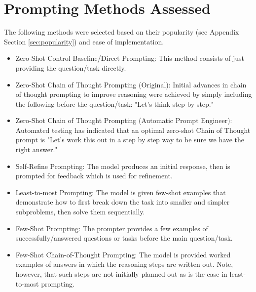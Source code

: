 \documentclass[11pt]{article}
\begin{document}
\section*{Prompting Methods Assessed}

The following methods were selected based on their popularity (see Appendix Section \ref{sec:popularity}) and ease of implementation.

\begin{itemize}
  \item Zero-Shot Control Baseline/Direct Prompting: This method consists of just providing the question/task directly.
  \item Zero-Shot Chain of Thought Prompting (Original): Initial advances in chain of thought prompting to improve reasoning were achieved by simply including the following before the question/task: "Let's think step by step." \cite{kojima_large_2023}
  \item Zero-Shot Chain of Thought Prompting (Automatic Prompt Engineer): Automated testing has indicated that an optimal zero-shot Chain of Thought prompt is "Let's work this out in a step by step way to be sure we have the right answer." \cite{zhou_large_2022}
  \item Self-Refine Prompting: The model produces an initial response, then is prompted for feedback which is used for refinement. \cite{madaan_self-refine_2023}
  \item Least-to-most Prompting: The model is given few-shot examples that demonstrate how to first break down the task into smaller and simpler subproblems, then solve them sequentially. \cite{zhou_least--most_2023}
  \item Few-Shot Prompting: The prompter provides a few examples of successfully/answered questions or tasks before the main question/task.
  \item Few-Shot Chain-of-Thought Prompting: The model is provided worked examples of answers in which the reasoning steps are written out. \cite{wei_chain--thought_nodate} Note, however, that such steps are not initially planned out as is the case in least-to-most prompting.
\end{itemize}
\end{document}
